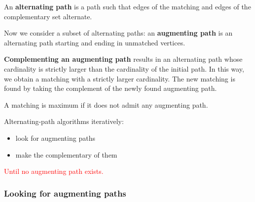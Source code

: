 \documentclass[10pt,a4paper]{article}
\begin{document}
An \textbf{alternating path} is a path such that edges of the matching and edges of the complementary set alternate.

Now we consider a subset of alternating paths: an \textbf{augmenting path} is an alternating path starting and ending in unmatched vertices.

\textbf{Complementing an augmenting path} results in an alternating path whose cardinality is strictly larger than the cardinality of the initial path. In this way, we obtain a matching with a strictly larger cardinality. The new matching is found by taking the complement of the newly found augmenting path.

A matching is maximum if it does not admit any augmenting path.
\newline

Alternating-path algorithms iteratively:

\begin{itemize}
\item look for augmenting paths
\item make the complementary of them
\end{itemize}

\textcolor{red}{Until no augmenting path exists.}

\subsubsection{Looking for augmenting paths}\label{looking-for-augmenting-paths}
\end{document}
